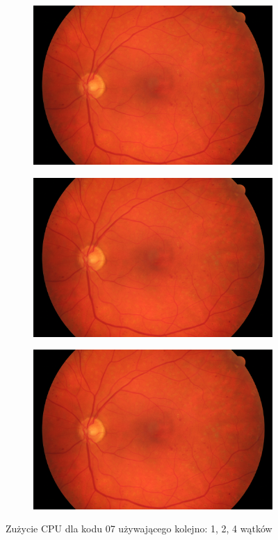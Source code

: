 \documentclass[12pt]{article}
\begin{document}
\begin{figure}[h!]
	\begin{subfigure}[b]{0.32\linewidth}
		\includegraphics[width=\linewidth]{images/01_dr.jpg}
	\end{subfigure}
	\begin{subfigure}[b]{0.32\linewidth}
		\includegraphics[width=\linewidth]{images/01_dr.jpg}
	\end{subfigure}
	\begin{subfigure}[b]{0.32\linewidth}
		\includegraphics[width=\linewidth]{images/01_dr.jpg}
	\end{subfigure}
	\caption{Zużycie CPU dla kodu 07 używającego kolejno: 1, 2, 4 wątków}
\end{figure}
\end{document}
